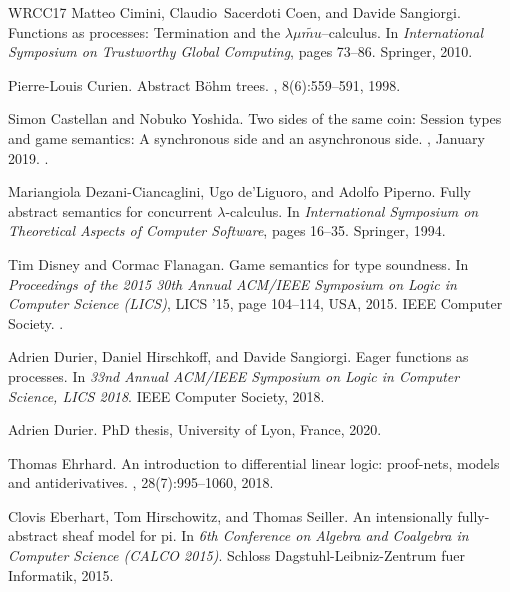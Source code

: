 \documentclass[11pt,a4paper]{amsart}
\theoremstyle{plain}
\theoremstyle{definition}
\theoremstyle{defC}
\theoremstyle{thmC}
\theoremstyle{plain}
\numberwithin{equation}{section}
\theoremstyle{plain}
\theoremstyle{definition}
\begin{document}
\begin{thebibliography}{WRCC17}
Matteo Cimini, Claudio~Sacerdoti Coen, and Davide Sangiorgi.
\newblock Functions as processes: Termination and the
  $\lambda\mu\widetilde{mu}$--calculus.
\newblock In {\em International Symposium on Trustworthy Global Computing},
  pages 73--86. Springer, 2010.

Pierre-Louis Curien.
\newblock Abstract {B}{\"o}hm trees.
, 8(6):559--591,
  1998.

Simon Castellan and Nobuko Yoshida.
\newblock Two sides of the same coin: Session types and game semantics: A
  synchronous side and an asynchronous side.
, January 2019.
\newblock \href {https://doi.org/10.1145/3290340} {}.

Mariangiola Dezani-Ciancaglini, Ugo de'Liguoro, and Adolfo Piperno.
\newblock Fully abstract semantics for concurrent $\lambda$-calculus.
\newblock In {\em International Symposium on Theoretical Aspects of Computer
  Software}, pages 16--35. Springer, 1994.

Tim Disney and Cormac Flanagan.
\newblock Game semantics for type soundness.
\newblock In {\em Proceedings of the 2015 30th Annual ACM/IEEE Symposium on
  Logic in Computer Science (LICS)}, LICS '15, page 104–114, USA, 2015. IEEE
  Computer Society.
\newblock \href {https://doi.org/10.1109/LICS.2015.20}
  {}.

Adrien Durier, Daniel Hirschkoff, and Davide Sangiorgi.
\newblock Eager functions as processes.
\newblock In {\em 33nd Annual {ACM/IEEE} Symposium on Logic in Computer
  Science, {LICS} 2018}. {IEEE} Computer Society, 2018.

Adrien Durier.
\newblock PhD thesis, University of Lyon, France, 2020.

Thomas Ehrhard.
\newblock An introduction to differential linear logic: proof-nets, models and
  antiderivatives.
, 28(7):995--1060,
  2018.

Clovis Eberhart, Tom Hirschowitz, and Thomas Seiller.
\newblock An intensionally fully-abstract sheaf model for pi.
\newblock In {\em 6th Conference on Algebra and Coalgebra in Computer Science
  (CALCO 2015)}. Schloss Dagstuhl-Leibniz-Zentrum fuer Informatik, 2015.


\end{thebibliography}
\end{document}
